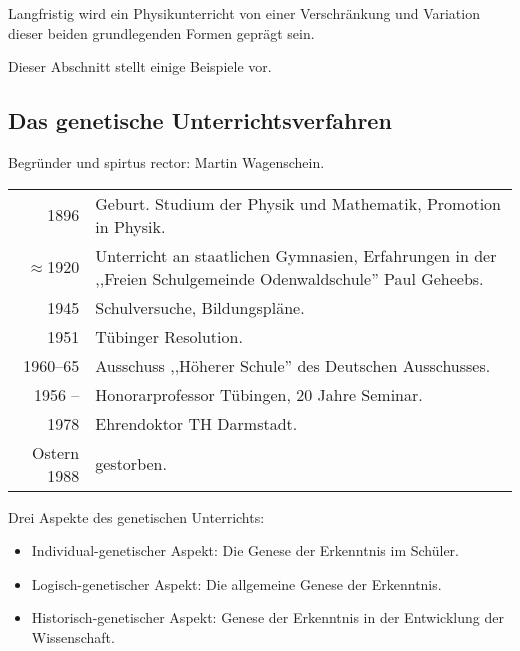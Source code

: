 Langfristig wird ein Physikunterricht von einer
Verschr\"{a}nkung und Variation dieser beiden grundlegenden
Formen gepr\"{a}gt sein.

Dieser Abschnitt stellt einige Beispiele vor.

\subsection{Das genetische Unterrichtsverfahren}

Begr\"{u}nder und spirtus rector: Martin Wagenschein.
\bip
\begin{tabular}{r p{12cm}}
1896 &  Geburt. Studium der Physik und Mathematik,
Promotion in Physik.
\\
$\approx$1920 &  Unterricht an staatlichen Gymnasien,
Erfahrungen in der ,,Freien Schulgemeinde Odenwaldschule''
Paul Geheebs.
\\
1945 &  Schulversuche, Bildungspl\"{a}ne.
\\
1951 &  T\"{u}binger Resolution.
\\
1960--65 &  Ausschuss ,,H\"{o}herer Schule'' des Deutschen Ausschusses.
\\
1956 -- &  Honorarprofessor T\"{u}bingen, 20 Jahre Seminar.
\\
1978 &  Ehrendoktor TH Darmstadt.
\\
Ostern 1988 &  gestorben.
\end{tabular}

\bip
Drei Aspekte des genetischen Unterrichts:
\begin{itemize}
\item Individual-genetischer Aspekt: Die Genese der Erkenntnis im
Sch\"{u}ler.
\item Logisch-genetischer Aspekt: Die allgemeine Genese der
Erkenntnis.
\item Historisch-genetischer Aspekt: Genese der Erkenntnis in der
Entwicklung der Wissenschaft.
\end{itemize}


